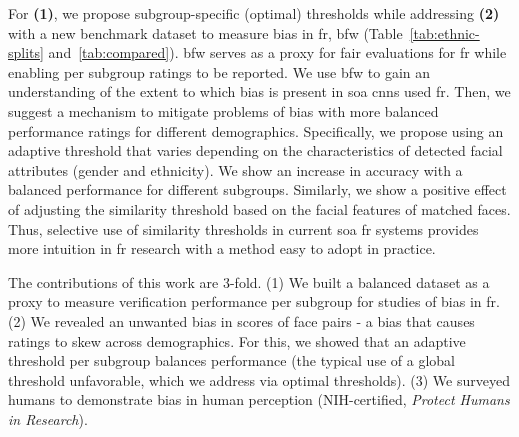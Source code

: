    
    For \textbf{(1)}, we propose subgroup-specific (\ie optimal) thresholds while addressing \textbf{(2)} with a new benchmark dataset to measure bias in \gls{fr}, \gls{bfw} (Table~\ref{tab:ethnic-splits} and~\ref{tab:compared}). \gls{bfw} serves as a proxy for fair evaluations for \gls{fr} while enabling per subgroup ratings to be reported. We use \gls{bfw} to gain an understanding of the extent to which bias is present in \gls{soa} \gls{cnn}s used \gls{fr}. Then, we suggest a mechanism to mitigate problems of bias with more balanced performance ratings for different demographics. Specifically, we propose using an adaptive threshold that varies depending on the characteristics of detected facial attributes (\ie gender and ethnicity). We show an increase in accuracy with a balanced performance for different subgroups. Similarly, we show a positive effect of adjusting the similarity threshold based on the facial features of matched faces. Thus, selective use of similarity thresholds in current \gls{soa} \gls{fr} systems provides more intuition in \gls{fr} research with a method easy to adopt in practice. 
    
    
    The contributions of this work are 3-fold. (1) We built a balanced dataset as a proxy to measure verification performance per subgroup for studies of bias in \gls{fr}. (2) We revealed an unwanted bias in scores of face pairs - a bias that causes ratings to skew across demographics. For this, we showed that an adaptive threshold per subgroup balances performance (\ie the typical use of a global threshold unfavorable, which we address via optimal thresholds). (3) We surveyed humans to demonstrate bias in human perception (NIH-certified, \textit{Protect Humans in Research}).%

